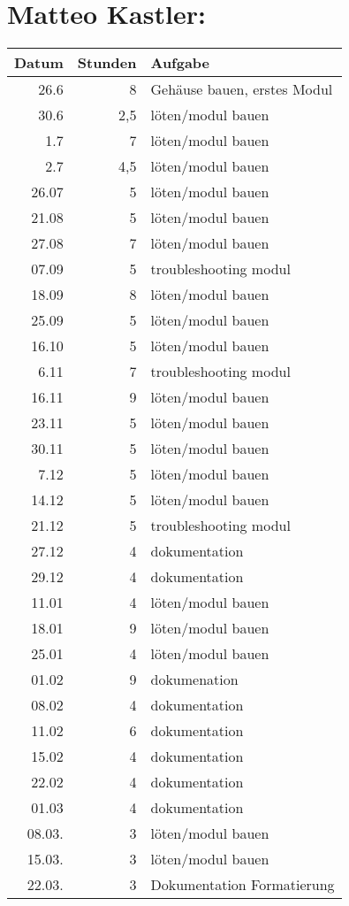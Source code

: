 \section{Matteo Kastler:}
\label{sec:orgb04aec0}
\begin{center}
\begin{tabular}{rrl}
\hline
Datum & Stunden & Aufgabe\\
\hline
26.6 & 8 & Gehäuse bauen, erstes Modul\\
30.6 & 2,5 & löten/modul bauen\\
1.7 & 7 & löten/modul bauen\\
2.7 & 4,5 & löten/modul bauen\\
26.07 & 5 & löten/modul bauen\\
21.08 & 5 & löten/modul bauen\\
27.08 & 7 & löten/modul bauen\\
07.09 & 5 & troubleshooting modul\\
18.09 & 8 & löten/modul bauen\\
25.09 & 5 & löten/modul bauen\\
16.10 & 5 & löten/modul bauen\\
6.11 & 7 & troubleshooting modul\\
16.11 & 9 & löten/modul bauen\\
23.11 & 5 & löten/modul bauen\\
30.11 & 5 & löten/modul bauen\\
7.12 & 5 & löten/modul bauen\\
14.12 & 5 & löten/modul bauen\\
21.12 & 5 & troubleshooting modul\\
27.12 & 4 & dokumentation\\
29.12 & 4 & dokumentation\\
11.01 & 4 & löten/modul bauen\\
18.01 & 9 & löten/modul bauen\\
25.01 & 4 & löten/modul bauen\\
01.02 & 9 & dokumenation\\
08.02 & 4 & dokumentation\\
11.02 & 6 & dokumentation\\
15.02 & 4 & dokumentation\\
22.02 & 4 & dokumentation\\
01.03 & 4 & dokumentation\\
08.03. & 3 & löten/modul bauen\\
15.03. & 3 & löten/modul bauen\\
22.03. & 3 & Dokumentation Formatierung\\
\hline
\end{tabular}
\end{center}
